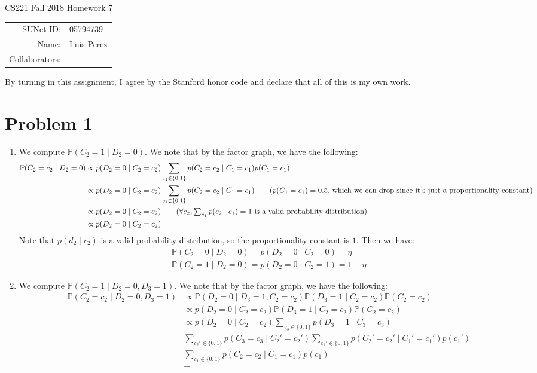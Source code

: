 \documentclass[12pt]{article}
\begin{document}
\begin{center}
{\Large CS221 Fall 2018 Homework 7}

\begin{tabular}{rl}
SUNet ID: & 05794739 \\
Name: & Luis Perez \\
Collaborators: &
\end{tabular}
\end{center}

By turning in this assignment, I agree by the Stanford honor code and declare
that all of this is my own work.

\section*{Problem 1}

\begin{enumerate}[label=(\alph*)]
  \item We compute $\mathbb{P}(C_2 = 1 \mid D_2 = 0)$. We note that by the factor graph, we have the following:
    \begin{align*}
      \mathbb{P}(C_2 = c_2 \mid D_2 = 0) &\propto p(D_2 = 0 \mid C_2 = c_2)\sum_{c_1 \in \{0,1 \}} p(C_2 = c_2 \mid C_1 = c_1)p(C_1 = c_1) \\
      &\propto p(D_2 = 0 \mid C_2 = c_2)\sum_{c_1 \in \{0,1 \}} p(C_2 = c_2 \mid C_1 = c_1) \tag{$p(C_1 = c_1) = 0.5$, which we can drop since it's just a proportionality constant} \\
      &\propto p(D_2 = 0 \mid C_2 = c_2) \tag{$\forall c_2, \sum_{c_1} p(c_2 \mid c_1)=1$ is a valid probability distribution} \\
      &\propto p(D_2 = 0 \mid C_2 = c_2)
    \end{align*}
    Note that $p(d_2 \mid c_2)$ is a valid probability distribution, so the proportionality constant is $1$. Then we have:
    \begin{align*}
      \mathbb{P}(C_2 = 0 \mid D_2 = 0) = p(D_2 = 0 \mid C_2 = 0) = \eta \\
      \mathbb{P}(C_2 = 1 \mid D_2 = 0) = p(D_2 = 0 \mid C_2 = 1) = 1 - \eta
    \end{align*}
  \item We compute $\mathbb{P}(C_2 = 1 \mid D_2 = 0, D_3 = 1)$. We note that by the factor graph, we have the following:
   \begin{align*}
    \mathbb{P}(C_2 = c_2 \mid D_2 = 0, D_3 = 1) &\propto \mathbb{P}(D_2 = 0 \mid D_3 = 1, C_2 = c_2)\mathbb{P}(D_3 = 1 \mid C_2 = c_2)\mathbb{P}(C_2 = c_2) \tag{Bayes' Rule} \\
    &\propto p(D_2 = 0 \mid C_2 = c_2)\mathbb{P}(D_3 = 1 \mid C_2 = c_2)\mathbb{P}(C_2 = c_2) \tag{$D_2 \perp D_3 \mid C_2$} \\
    &\propto p(D_2 = 0 \mid C_2 = c_2)\sum_{c_3 \in \{0,1\}} p(D_3 = 1 \mid C_3 = c_3) \\
    &\sum_{c_2' \in \{0,1\}} p(C_3 = c_3 \mid C_2' = c_2')\sum_{c_1' \in \{0,1\}} p(C_2' = c_2' \mid C_1' = c_1')p(c_1') \\
    &\sum_{c_1 \in \{0,1\}} p(C_2 = c_2 \mid C_1 = c_1)p(c_1) \\
    &= 
   \end{align*}
\end{enumerate}
\end{document}
